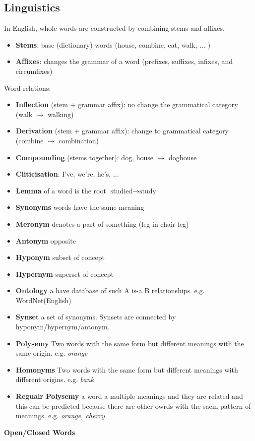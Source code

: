 \documentclass[8pt]{extarticle} %
\begin{document}
\begin{multicols*}{3}
\subsection*{Linguistics}
In English, whole words are constructed by combining stems and affixes.
\begin{itemize}[label=\textbullet, labelsep=0.3em, leftmargin=0.5em, itemsep=0em]
\item \textbf{Stems}: base (dictionary) words (house, combine, eat, walk, $\ldots$ )
\item \textbf{Affixes}: changes the grammar of a word (prefixes, suffixes, infixes, and circumfixes)
\end{itemize}
Word relations:
\begin{itemize}[label=-, labelsep=0.3em, leftmargin=0.5em, itemsep=0em]
    \item \textbf{Inflection} (stem + grammar affix): no change the grammatical category (walk $\rightarrow$ walking)
    \item \textbf{Derivation} (stem + grammar affix): change to grammatical category (combine $\rightarrow$ combination)
    \item \textbf{Compounding} (stems together): dog, house $\rightarrow$ doghouse
    \item \textbf{Cliticisation}: I've, we're, he's, ...
    \item \textbf{Lemma} of a word is the root $\text{studied}\rightarrow \text{study}$\\
    \item \textbf{Synonyms} words have the same meaning 
    \item \textbf{Meronym} denotes a part of something (leg in chair-leg)
    \item \textbf{Antonym} opposite
    \item \textbf{Hyponym} subset of concept
    \item \textbf{Hypernym} superset of concept 
    \item \textbf{Ontology} a have database of such A is-a B relationships. e.g. WordNet(English)
    \item \textbf{Synset} a set of synonyms. Synsets are connected by hyponym/hypernym/antonym. 
    \item \textbf{Polysemy} Two words with the same form but different meanings with the same origin. e.g. \textit{orange}
    \item \textbf{Homonyms} Two words with the same form but different meanings with different origins. e.g. \textit{bank}
    \item \textbf{Regualr Polysemy} a word a multiple meanings and they are related and this can be predicted because there are other owrds with the saem pattern of meanings. e.g. \textit{orange, cherry}
\end{itemize}
\textbf{Open/Closed Words}\\


\end{multicols*}
\end{document}
